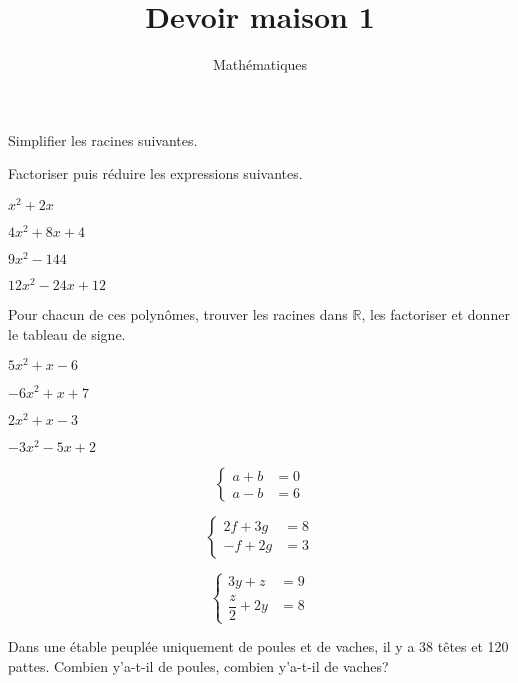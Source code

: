 \documentclass[a4paper,12pt]{scrartcl}
\date{}
\title{Devoir maison 1}
\author{Mathématiques}
\begin{document}
\maketitle


Simplifier les racines suivantes.
\begin{multicols}{2}




\end{multicols}


Factoriser puis réduire les expressions suivantes.

\begin{multicols}{2}
\question{}
$x^2 + 2x$

\question{}
$4x^2 + 8x + 4$

\question{}
$9x^2 - 144$

\question{}
$12x^2 - 24x + 12$
\end{multicols}


Pour chacun de ces polynômes, trouver les racines dans $\mathbb{R}$, les factoriser et donner le tableau de signe.

\begin{multicols}{2}
\question{}
$5x^2 + x - 6$

\question{}
$-6x^2 + x + 7$

\question{}
$2x^2 + x - 3$

\question{}
$-3x^2 -5x +2$
\end{multicols}


\begin{multicols}{2}
\question{}
$$
\begin{cases} 
a+b &= 0 \\
a-b &= 6
\end{cases}
$$

\question{}
$$
\begin{cases} 
2f+3g &= 8 \\
-f+2g &= 3
\end{cases}
$$

\question{}
$$
\begin{cases} 
3y+z &= 9 \\
\dfrac{z}{2} + 2y &= 8
\end{cases}
$$

\question{}
Dans une étable peuplée uniquement de poules et de vaches, il y a 38 têtes et 120 pattes. Combien y'a-t-il de poules, combien y'a-t-il de vaches?
\end{multicols}
\end{document}
